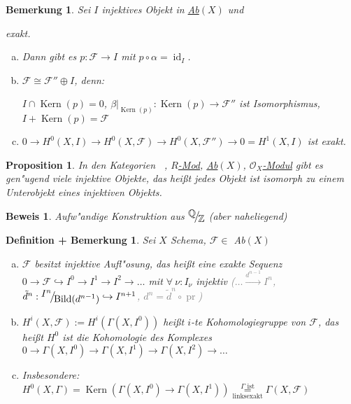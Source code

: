 \documentclass[paper = A4, fontsize=12pt, numbers=noendperiod, chapterprefix=true]{scrbook}
\theoremstyle{break}
\newtheorem{DefBem}[Def]{Definition + Bemerkung}
\newtheorem{Bem}[Def]{Bemerkung}
\newtheorem{Prop}[Def]{Proposition}
\theoremstyle{nonumberbreak}
\newtheorem{bew}{Beweis}
\theoremstyle{nonumberplain}
\DeclareMathOperator{\Bild}{Bild}
\DeclareMathOperator{\Kern}{Kern}
\DeclareMathOperator{\id}{id}
\DeclareMathOperator{\pr}{pr}
\DeclareMathOperator{\Ab}{\underline{Ab}}
\newcommand{\Q}{\mathbb{Q}}
\newcommand{\Z}{\mathbb{Z}}
\newcommand{\calF}{\mathcal{F}}
\newcommand{\calO}{\mathcal{O}}
\newcommand{\FakRaum}[2]{
	\raisebox{0.7ex}{\ensuremath{#1}}
	\ensuremath{\mkern-3mu}\big/\ensuremath{\mkern-3mu}
	\raisebox{-0.6ex}{\ensuremath{#2}}}
\begin{document}
\begin{Bem}
Sei $I$ injektives Objekt in \underline{Ab$(X)$} und  exakt.

\begin{enumerate}[a)]
\item
	Dann gibt es $p: \calF \to I$ mit $p \circ \alpha = \id_I$.
\item
	$\calF \cong \calF'' \oplus I$, \emph{denn:}
	
	$I \cap \Kern(p) = 0$, $\beta|_{\Kern(p)}: \Kern(p) \to \calF''$ ist Isomorphismus, $I + \Kern(p) = \calF$
\item
	$0 \to H^0(X, I) \to H^0(X, \calF) \to H^0(X, \calF'') \to 0 = H^1(X, I)$ ist exakt.
\end{enumerate}\end{Bem}

\begin{Prop}
In den Kategorien $\Ab$, \underline{$R$-Mod}, \underline{Ab$(X)$}, \underline{$\calO_X$-Modul} gibt es gen"ugend viele injektive Objekte, das hei\ss t jedes Objekt ist isomorph zu einem Unterobjekt eines injektiven Objekts.
\end{Prop}

\begin{bew}
Aufw"andige Konstruktion aus $\FakRaum{\Q}{\Z}$ (aber naheliegend)
\end{bew}

\begin{DefBem}\label{12.8}
Sei $X$ Schema, $\calF \in$ Ab$(X)$
\begin{enumerate}[a)]
\item
	$\calF$ besitzt injektive Aufl"osung, das hei\ss t eine exakte Sequenz $0 \to \calF \hookrightarrow I^0 \to I^1 \to I^2 \to \ldots$ mit $\forall \ \nu: I_\nu$ injektiv \textcolor{gray}{($\ldots \xrightarrow{d^{n-1}} I^n $, $\tilde d^n: \FakRaum{I^n}{\Bild(d^{n-1})} \hookrightarrow I^{n+1}$, $d^n = \tilde d^n \circ \pr$)}
\item
	$H^i(X, \calF) := H^i(\Gamma(X, I^0))$ hei\ss t $i$-te Kohomologiegruppe von $\calF$, das hei\ss t $H^0$ ist die Kohomologie des Komplexes $0 \to \Gamma(X, I^0) \to \Gamma(X, I^1) \to \Gamma(X, I^2) \to \ldots$
\item
	Insbesondere: $H^0(X, \Gamma) = \Kern(\Gamma(X, I^0) \to \Gamma(X, I^1)) \overset{\Gamma\text{ ist}}{\underset{\text{linksexakt}}{=}} \Gamma(X, \calF)$
\end{enumerate}\end{DefBem}
\end{document}
